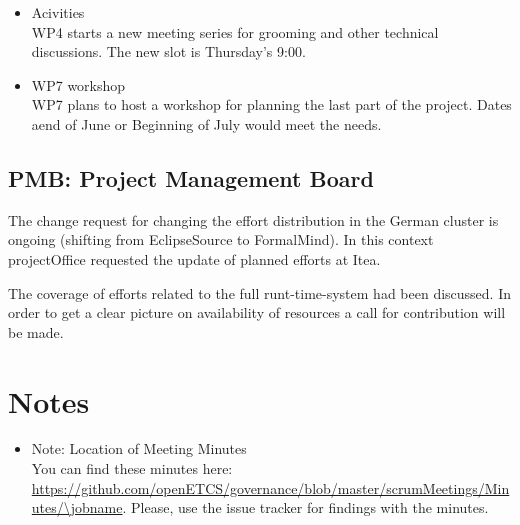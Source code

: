 \documentclass[a4paper, 11pt]{article}
\begin{document}
\begin{itemize}
\item Acivities\\
WP4 starts a new meeting series for grooming and other technical discussions. The new slot is  Thursday's 9:00. 
\item WP7 workshop\\
WP7 plans to host a workshop for planning the last part of the project. Dates aend of June or Beginning of July would meet the needs. 
\end{itemize}

\subsection{PMB: Project Management Board}

The change request for changing the effort distribution in the German cluster is ongoing (shifting from EclipseSource to FormalMind). In this context projectOffice requested the update of planned efforts at Itea.

The coverage of efforts related to the full runt-time-system had been discussed. In order to get a clear picture on availability of resources a call for contribution will be made.

\section{Notes}
\begin{itemize}

\item Note: Location of Meeting Minutes\\
You can find these minutes here: \url{https://github.com/openETCS/governance/blob/master/scrumMeetings/Minutes/\jobname}. Please, use the issue tracker for findings with the minutes.

\end{itemize}
\end{document}
